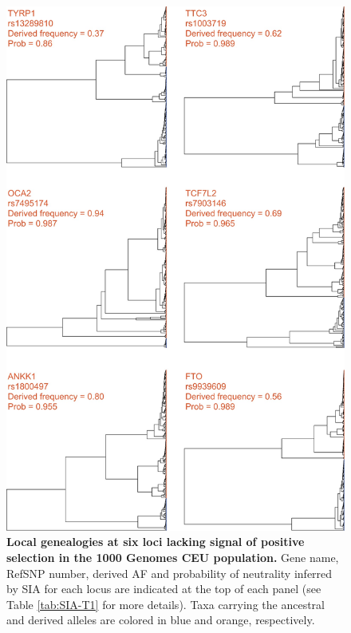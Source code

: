 \begin{figure}
    \centering
    \includegraphics[scale=0.25]{SIA_figs/SIA_F6.jpeg}
    \caption[Local genealogies at six loci lacking signal of positive selection in the 1000 Genomes CEU population.]{\textbf{Local genealogies at six loci lacking signal of positive selection in the 1000 Genomes CEU population.} Gene name, RefSNP number, derived AF and probability of neutrality inferred by \ac{SIA} for each locus are indicated at the top of each panel (see Table \ref{tab:SIA-T1} for more details). Taxa carrying the ancestral and derived alleles are colored in blue and orange, respectively.}
    \label{fig:SIA-F6}
\end{figure}

